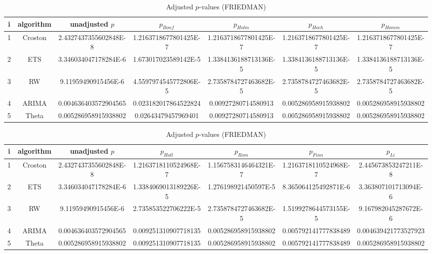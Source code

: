 \documentclass[a4paper,10pt]{article}
\begin{document}
\begin{landscape}
\begin{table}[!htp]
\centering\scriptsize
\caption{Adjusted $p$-values (FRIEDMAN)}
\begin{tabular}{ccccccc}
i&algorithm&unadjusted $p$&$p_{Bonf}$&$p_{Holm}$&$p_{Hoch}$&$p_{Homm}$\\
\hline
1&Croston&2.4327437355602848E-8&1.2163718677801425E-7&1.2163718677801425E-7&1.2163718677801425E-7&1.2163718677801425E-7\\
2&ETS&3.346034047178284E-6&1.673017023589142E-5&1.3384136188713136E-5&1.3384136188713136E-5&1.3384136188713136E-5\\
3&RW&9.11959490915456E-6&4.5597974545772806E-5&2.7358784727463682E-5&2.7358784727463682E-5&2.7358784727463682E-5\\
4&ARIMA&0.004636403572904565&0.023182017864522824&0.00927280714580913&0.005286958915938802&0.005286958915938802\\
5&Theta&0.005286958915938802&0.02643479457969401&0.00927280714580913&0.005286958915938802&0.005286958915938802\\
\hline
\end{tabular}
\end{table}

\begin{table}[!htp]
\centering\scriptsize
\caption{Adjusted $p$-values (FRIEDMAN)}
\begin{tabular}{ccccccc}
i&algorithm&unadjusted $p$&$p_{Holl}$&$p_{Rom}$&$p_{Finn}$&$p_{Li}$\\
\hline
1&Croston&2.4327437355602848E-8&1.2163718110524968E-7&1.1567583146464321E-7&1.2163718110524968E-7&2.445673853247211E-8\\
2&ETS&3.346034047178284E-6&1.3384069013189226E-5&1.276198921450597E-5&8.365064125492871E-6&3.363807101713094E-6\\
3&RW&9.11959490915456E-6&2.735853522706222E-5&2.7358784727463682E-5&1.5199278644573155E-5&9.167982045287672E-6\\
4&ARIMA&0.004636403572904565&0.009251310907718135&0.005286958915938802&0.005792141777838489&0.004639421773527923\\
5&Theta&0.005286958915938802&0.009251310907718135&0.005286958915938802&0.005792141777838489&0.005286958915938802\\
\hline
\end{tabular}
\end{table}


\newpage


\end{landscape}
\end{document}

